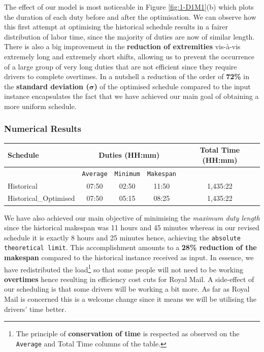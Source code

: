 \vspace{\baselineskip}
\noindent
The effect of our model is most noticeable in Figure \ref{fig:1-D1M1}(b) which plots the duration of each duty before and after the optimisation. We can observe how this first attempt at optimising the historical schedule results in a fairer distribution of labor time, since the majority of duties are now of similar length. There is also a big improvement in the \textbf{reduction of extremities} vis-\`a-vis extremely long and extremely short shifts, allowing us to prevent the occurrence of a large group of very long duties that are not efficient since they require drivers to complete overtimes. In a nutshell a reduction of the order of \textbf{72\%} in the \textbf{standard deviation ($\pmb{\sigma}$)} of the optimised schedule compared to the input instance encapsulates the fact that we have achieved our main goal of obtaining a more uniform schedule.

\subsubsection*{Numerical Results}


\begin{table}[h]
\small
    \centering 
    \begin{tabular}{|l|c|c|c|c|}
        \hline
        \textbf{Schedule} & \multicolumn{3}{|c|}{ \textbf{Duties (HH:mm)}} & \textbf{Total Time (HH:mm)}  \\
        \hline
        & \texttt{Average} &  \texttt{Minimum} & \texttt{Makespan} & \\
        \hline
        Historical & 07:50 & 02:50 & 11:50 & 1,435:22 \\
        \hline
        Historical\_Optimised & 07:50 & 05:15 & 08:25 & 1,435:22 \\
        \hline
    \end{tabular}%
    \medbreak
\end{table}


\vspace{\baselineskip}
\noindent
We have also achieved our main objective of minimising the \textit{maximum duty length} since the historical makespan was 11 hours and 45 minutes whereas in our revised schedule it is exactly 8 hours and 25 minutes hence, achieving the \texttt{absolute theoretical limit}. This accomplishment amounts to a \textbf{28\% reduction of the makespan} compared to the historical instance received as input. In essence, we have redistributed the load\footnote{The principle of \textbf{conservation of time} is respected as observed on the \texttt{Average} and Total Time columns of the table.} so that some people will not need to be working \textbf{overtimes} hence resulting in efficiency cost cuts for Royal Mail. A side-effect of our scheduling is that some drivers will be working a bit more. As far as Royal Mail is concerned this is a welcome change since it means we will be utilising the drivers' time better.

